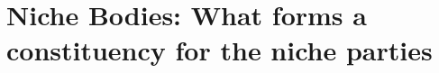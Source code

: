 \section{Niche Bodies: What forms a constituency for the niche parties}\label{sec:Niche Bodies} %
%
%
